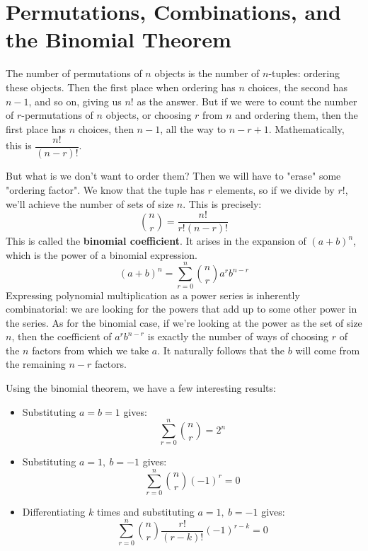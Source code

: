 \documentclass[12pt]{article}
\begin{document}
\section{Permutations, Combinations, and the Binomial Theorem}
The number of permutations of $n$ objects is the number of $n$-tuples: ordering these objects. Then the first place when ordering has $n$ choices, the second has $n-1$, and so on, giving us $n!$ as the answer. But if we were to count the number of $r$-permutations of $n$ objects, or choosing $r$ from $n$ and ordering them, then the first place has $n$ choices, then $n-1$, all the way to $n-r+1$. Mathematically, this is $\dfrac{n!}{(n-r)!}$.
\par But what is we don't want to order them? Then we will have to "erase" some "ordering factor". We know that the tuple has $r$ elements, so if we divide by $r!$, we'll achieve the number of sets of size $n$. This is precisely:
\begin{equation*}
    \binom{n}{r} = \dfrac{n!}{r!(n-r)!}
\end{equation*}
This is called the \textbf{binomial coefficient}. It arises in the expansion of $(a+b)^n$, which is the power of a binomial expression.
\begin{equation*}
    (a+b)^n = \sum_{r=0}^n \binom{n}{r} a^r b^{n-r}
\end{equation*}
Expressing polynomial multiplication as a power series is inherently combinatorial: we are looking for the powers that add up to some other power in the series. As for the binomial case, if we're looking at the power as the set of size $n$, then the coefficient of $a^r b^{n-r}$ is exactly the number of ways of choosing $r$ of the $n$ factors from which we take $a$. It naturally follows that the $b$ will come from the remaining $n-r$ factors. 
\par Using the binomial theorem, we have a few interesting results:
\begin{itemize}
    \item Substituting $a=b=1$ gives:
    \begin{equation*}
        \sum_{r=0}^n \binom{n}{r} = 2^n
    \end{equation*}
    \item Substituting $a=1, \ b = -1$ gives:
    \begin{equation*}
        \sum_{r=0}^n \binom{n}{r}(-1)^r = 0
    \end{equation*}
    \item Differentiating $k$ times and substituting $a=1, \ b = -1$ gives:
    \begin{equation*}
        \sum_{r=0}^n \binom{n}{r}\dfrac{r!}{(r-k)!}(-1)^{r-k} = 0
    \end{equation*}
\end{itemize}
\end{document}

